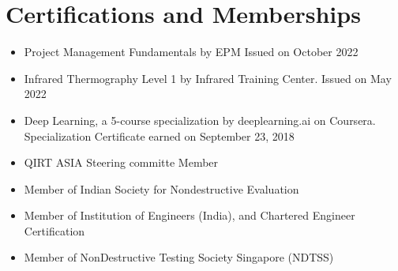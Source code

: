 \documentclass{my_cv}%
\begin{document}
\section{Certifications and Memberships}
\vspace{1em}
\begin{itemize}[leftmargin=0.15in]
\setlength\itemsep{-0.1em}
\color{mygray}
\item[\faCertificate] Project Management Fundamentals by EPM Issued on October 2022
\item[\faCertificate] Infrared Thermography Level 1 by Infrared Training Center. Issued on May 2022
\item[\faCertificate] Deep Learning, a 5-course specialization by deeplearning.ai on Coursera. Specialization Certificate earned on September 23, 2018
\item [\faUsers] QIRT ASIA Steering committe Member
\item [\faUsers] Member of Indian Society for Nondestructive Evaluation
\item [\faUsers] Member of Institution of Engineers (India), and Chartered Engineer Certification
\item [\faUsers] Member of NonDestructive Testing Society Singapore (NDTSS)
\end{itemize}

\end{document}
